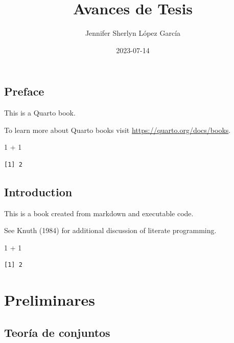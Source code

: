 \documentclass[
  letterpaper,
  DIV=11,
  numbers=noendperiod]{scrreport}
\title{Avances de Tesis}
\author{Jennifer Sherlyn López García}
\date{2023-07-14}
\newenvironment{Shaded}{\begin{snugshade}}{\end{snugshade}}
\newcommand{\DecValTok}[1]{\textcolor[rgb]{0.68,0.00,0.00}{#1}}
\newcommand{\SpecialCharTok}[1]{\textcolor[rgb]{0.37,0.37,0.37}{#1}}
\renewcommand*\contentsname{Tabla de contenidos}
\newcommand\contentsname{Tabla de contenidos}
\theoremstyle{plain}
\theoremstyle{definition}
\theoremstyle{definition}
\theoremstyle{plain}
\theoremstyle{remark}
\begin{document}
\maketitle
\renewcommand*\contentsname{Tabla de contenidos}
{
\hypersetup{linkcolor=}
\setcounter{tocdepth}{2}
\tableofcontents
}

\chapter*{Preface}\label{preface}


This is a Quarto book.

To learn more about Quarto books visit
\url{https://quarto.org/docs/books}.

\begin{Shaded}
\begin{Highlighting}[]
\DecValTok{1} \SpecialCharTok{+} \DecValTok{1}
\end{Highlighting}
\end{Shaded}

\begin{verbatim}
[1] 2
\end{verbatim}


\chapter{Introduction}\label{introduction}

This is a book created from markdown and executable code.

See Knuth (1984) for additional discussion of literate programming.

\begin{Shaded}
\begin{Highlighting}[]
\DecValTok{1} \SpecialCharTok{+} \DecValTok{1}
\end{Highlighting}
\end{Shaded}

\begin{verbatim}
[1] 2
\end{verbatim}

\part{Preliminares}

\chapter{Teoría de conjuntos}\label{teoruxeda-de-conjuntos}
\end{document}
